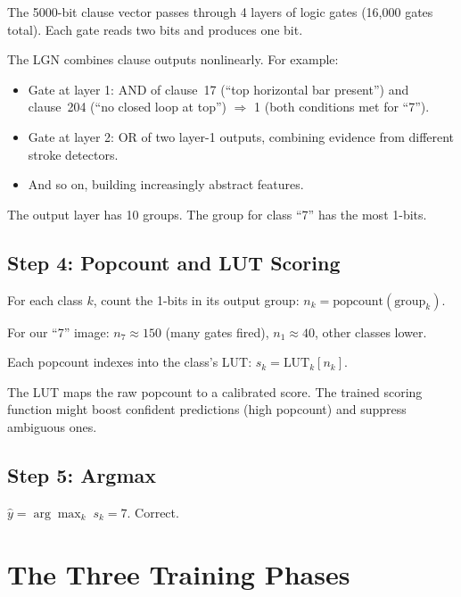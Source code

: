 The 5000-bit clause vector passes through 4 layers of logic gates
(16,000 gates total). Each gate reads two bits and produces one bit.

The LGN combines clause outputs nonlinearly. For example:
\begin{itemize}
  \item Gate at layer 1: AND of clause~17 (``top horizontal bar
    present'') and clause~204 (``no closed loop at top'')
    $\Rightarrow$ 1 (both conditions met for ``7'').
  \item Gate at layer 2: OR of two layer-1 outputs, combining
    evidence from different stroke detectors.
  \item And so on, building increasingly abstract features.
\end{itemize}

The output layer has 10 groups. The group for class ``7'' has the
most 1-bits.

\subsection{Step 4: Popcount and LUT Scoring}

For each class $k$, count the 1-bits in its output group:
$n_k = \text{popcount}(\text{group}_k)$.

For our ``7'' image: $n_7 \approx 150$ (many gates fired),
$n_1 \approx 40$, other classes lower.

Each popcount indexes into the class's LUT:
$s_k = \text{LUT}_k[n_k]$.

The LUT maps the raw popcount to a calibrated score. The trained
scoring function might boost confident predictions (high popcount)
and suppress ambiguous ones.

\subsection{Step 5: Argmax}

$\hat{y} = \arg\max_k \; s_k = 7$. Correct.


\section{The Three Training Phases}
\label{sec:three-phases}

